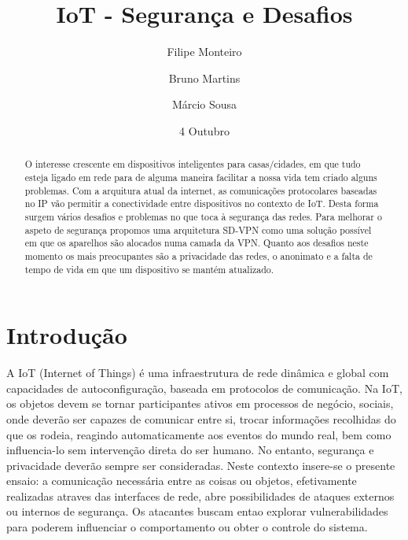 \documentclass{llncs}
\begin{document}
\mainmatter

\date{4 Outubro}
\title{IoT - Segurança e Desafios}

\titlerunning{}

\author{Filipe Monteiro \and Bruno Martins \and Márcio Sousa}






\maketitle
\begin{abstract}
O interesse crescente em dispositivos inteligentes para casas/cidades, em que tudo esteja ligado em rede para de alguma maneira facilitar a nossa vida tem criado alguns problemas. Com a arquitura atual da internet, as comunicações protocolares baseadas no IP vão permitir a conectividade entre dispositivos no contexto de IoT. Desta forma surgem vários desafios e problemas no que toca à segurança das redes. Para  melhorar o aspeto de segurança propomos uma arquitetura SD-VPN como uma solução possível em que os aparelhos são alocados numa camada da VPN. Quanto aos desafios neste momento os mais preocupantes são a privacidade das redes, o anonimato e a falta de tempo de vida em que um dispositivo se mantém atualizado.
\end{abstract}

\section{Introdução}

A IoT  (Internet of Things) é uma infraestrutura de rede dinâmica
e global com capacidades de autoconfiguração, baseada em protocolos de comunicação. Na IoT, os objetos devem se
tornar participantes ativos em processos de negócio, sociais, onde deverão ser capazes de comunicar entre si, trocar informações recolhidas do que os rodeia, reagindo automaticamente aos eventos do mundo real, bem como influencia-lo sem intervenção direta do ser humano.
No entanto, segurança e privacidade deverão sempre ser consideradas. Neste contexto insere-se o presente ensaio: a comunicação necessária entre as coisas ou objetos, efetivamente realizadas atraves das interfaces de rede, abre possibilidades de ataques externos ou internos de segurança. Os atacantes buscam entao explorar vulnerabilidades para poderem influenciar o comportamento ou obter o controle do sistema. 
\end{document}
